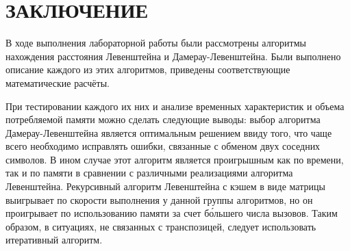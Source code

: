 \part*{ЗАКЛЮЧЕНИЕ}

В ходе выполнения лабораторной работы были рассмотрены алгоритмы нахождения расстояния Левенштейна и Дамерау-Левенштейна. Были выполнено описание каждого из этих алгоритмов, приведены соответствующие математические расчёты.  

При тестировании каждого их них и анализе временных характеристик и объема потребляемой памяти можно сделать следующие выводы: выбор алгоритма Дамерау-Левенштейна является оптимальным решением ввиду того, что чаще всего необходимо исправлять ошибки, связанные с обменом двух соседних символов. В ином случае этот алгоритм является проигрышным как по времени, так и по памяти в сравнении с различными реализациями алгоритма Левенштейна. Рекурсивный алгоритм Левенштейна с кэшем в виде матрицы выигрывает по скорости выполнения у данной группы алгоритмов, но он проигрывает по использованию памяти за счет б\'ольшего числа вызовов. Таким образом, в ситуациях, не связанных с транспозицей, следует использовать итеративный алгоритм.